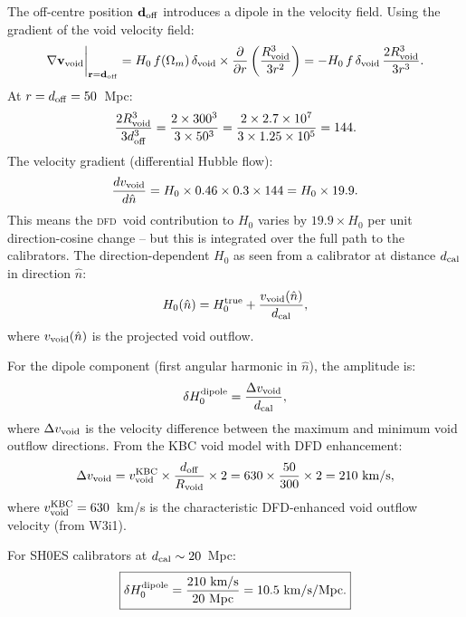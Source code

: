 \documentclass[aps,prd,twocolumn,superscriptaddress,nofootinbib,longbibliography]{revtex4-2}
\newcommand{\DFD}{\textsc{dfd}}
\begin{document}
The off-centre position $\mathbf{d}_{\rm off}$ introduces a dipole in the
velocity field.  Using the gradient of the void velocity field:
\begin{equation}
\nabla\mathbf{v}_{\rm void}\bigg|_{\mathbf{r}=\mathbf{d}_{\rm off}}
= H_0\,f(\Omega_m)\,\delta_{\rm void}
\times\frac{\partial}{\partial r}\left(\frac{R_{\rm void}^3}{3r^2}\right)
= -H_0\,f\,\delta_{\rm void}\,\frac{2R_{\rm void}^3}{3r^3}.
\end{equation}
At $r = d_{\rm off} = 50$~Mpc:
\begin{equation}
\frac{2R_{\rm void}^3}{3d_{\rm off}^3} = \frac{2\times300^3}{3\times50^3}
= \frac{2\times2.7\times10^7}{3\times1.25\times10^5} = 144.
\end{equation}
The velocity gradient (differential Hubble flow):
\begin{equation}
\frac{dv_{\rm void}}{d\hat{n}} = H_0\times0.46\times0.3\times144
= H_0\times19.9.
\end{equation}
This means the \DFD\ void contribution to $H_0$ varies by $19.9\times H_0$
per unit direction-cosine change -- but this is integrated over the full
path to the calibrators.  The direction-dependent $H_0$ as seen from a
calibrator at distance $d_{\rm cal}$ in direction $\hat{n}$:
\begin{equation}
H_0(\hat{n}) = H_0^{\rm true} + \frac{v_{\rm void}(\hat{n})}{d_{\rm cal}},
\end{equation}
where $v_{\rm void}(\hat{n})$ is the projected void outflow.

For the dipole component (first angular harmonic in $\hat{n}$), the
amplitude is:
\begin{equation}
\delta H_0^{\rm dipole} = \frac{\Delta v_{\rm void}}{d_{\rm cal}},
\end{equation}
where $\Delta v_{\rm void}$ is the velocity difference between the
maximum and minimum void outflow directions.  From the KBC void model
with DFD enhancement:
\begin{equation}
\Delta v_{\rm void} = v_{\rm void}^{\rm KBC}\times\frac{d_{\rm off}}{R_{\rm void}}
\times 2 = 630\times\frac{50}{300}\times2 = 210\ \si{km/s},
\end{equation}
where $v_{\rm void}^{\rm KBC} = 630$~km/s is the characteristic DFD-enhanced
void outflow velocity (from W3i1).

For SH0ES calibrators at $d_{\rm cal}\sim20$~Mpc:
\begin{equation}
\boxed{
\delta H_0^{\rm dipole} = \frac{210\ \text{km/s}}{20\ \text{Mpc}}
= 10.5\ \si{km/s/Mpc}.
}
\end{equation}
\end{document}
